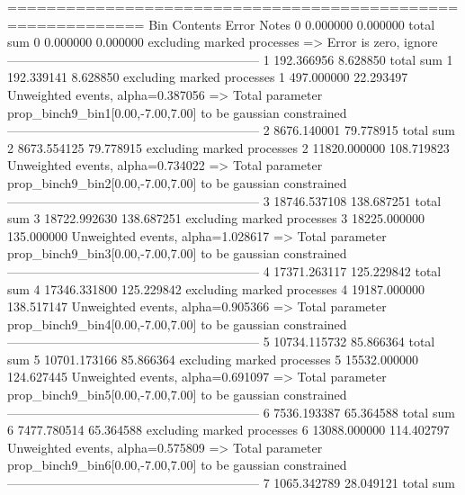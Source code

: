 ============================================================
Bin        Contents        Error           Notes                         
0          0.000000        0.000000        total sum                     
0          0.000000        0.000000        excluding marked processes    
  => Error is zero, ignore      
------------------------------------------------------------
1          192.366956      8.628850        total sum                     
1          192.339141      8.628850        excluding marked processes    
1          497.000000      22.293497       Unweighted events, alpha=0.387056
  => Total parameter prop_binch9_bin1[0.00,-7.00,7.00] to be gaussian constrained
------------------------------------------------------------
2          8676.140001     79.778915       total sum                     
2          8673.554125     79.778915       excluding marked processes    
2          11820.000000    108.719823      Unweighted events, alpha=0.734022
  => Total parameter prop_binch9_bin2[0.00,-7.00,7.00] to be gaussian constrained
------------------------------------------------------------
3          18746.537108    138.687251      total sum                     
3          18722.992630    138.687251      excluding marked processes    
3          18225.000000    135.000000      Unweighted events, alpha=1.028617
  => Total parameter prop_binch9_bin3[0.00,-7.00,7.00] to be gaussian constrained
------------------------------------------------------------
4          17371.263117    125.229842      total sum                     
4          17346.331800    125.229842      excluding marked processes    
4          19187.000000    138.517147      Unweighted events, alpha=0.905366
  => Total parameter prop_binch9_bin4[0.00,-7.00,7.00] to be gaussian constrained
------------------------------------------------------------
5          10734.115732    85.866364       total sum                     
5          10701.173166    85.866364       excluding marked processes    
5          15532.000000    124.627445      Unweighted events, alpha=0.691097
  => Total parameter prop_binch9_bin5[0.00,-7.00,7.00] to be gaussian constrained
------------------------------------------------------------
6          7536.193387     65.364588       total sum                     
6          7477.780514     65.364588       excluding marked processes    
6          13088.000000    114.402797      Unweighted events, alpha=0.575809
  => Total parameter prop_binch9_bin6[0.00,-7.00,7.00] to be gaussian constrained
------------------------------------------------------------
7          1065.342789     28.049121       total sum                     
